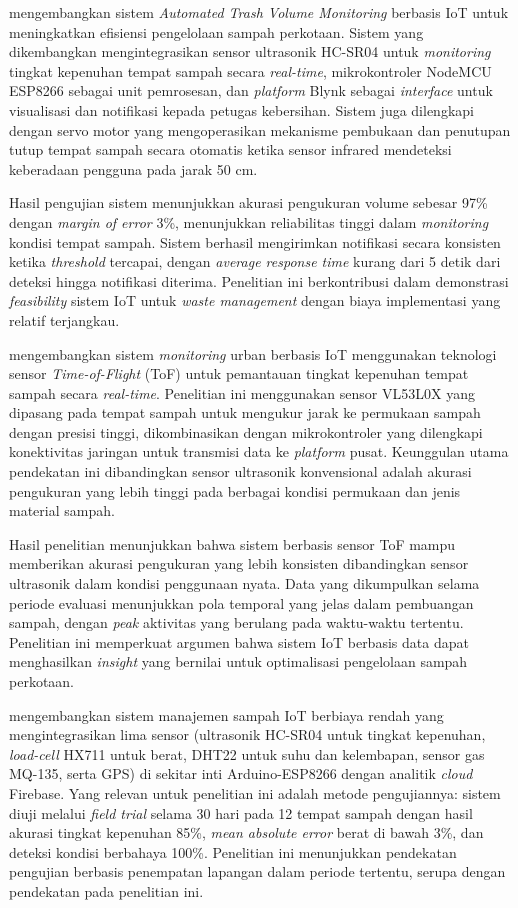 \textcite{latifah2021} mengembangkan sistem \textit{Automated Trash Volume Monitoring} berbasis IoT untuk meningkatkan efisiensi pengelolaan sampah perkotaan. Sistem yang dikembangkan mengintegrasikan sensor ultrasonik HC-SR04 untuk \textit{monitoring} tingkat kepenuhan tempat sampah secara \textit{real-time}, mikrokontroler NodeMCU ESP8266 sebagai unit pemrosesan, dan \textit{platform} Blynk sebagai \textit{interface} untuk visualisasi dan notifikasi kepada petugas kebersihan. Sistem juga dilengkapi dengan servo motor yang mengoperasikan mekanisme pembukaan dan penutupan tutup tempat sampah secara otomatis ketika sensor infrared mendeteksi keberadaan pengguna pada jarak 50 cm.

Hasil pengujian sistem menunjukkan akurasi pengukuran volume sebesar 97\% dengan \textit{margin of error} 3\%, menunjukkan reliabilitas tinggi dalam \textit{monitoring} kondisi tempat sampah. Sistem berhasil mengirimkan notifikasi secara konsisten ketika \textit{threshold} tercapai, dengan \textit{average response time} kurang dari 5 detik dari deteksi hingga notifikasi diterima. Penelitian ini berkontribusi dalam demonstrasi \textit{feasibility} sistem IoT untuk \textit{waste management} dengan biaya implementasi yang relatif terjangkau.

\textcite{pires2025} mengembangkan sistem \textit{monitoring} urban berbasis IoT menggunakan teknologi sensor \textit{Time-of-Flight} (ToF) untuk pemantauan tingkat kepenuhan tempat sampah secara \textit{real-time}. Penelitian ini menggunakan sensor VL53L0X yang dipasang pada tempat sampah untuk mengukur jarak ke permukaan sampah dengan presisi tinggi, dikombinasikan dengan mikrokontroler yang dilengkapi konektivitas jaringan untuk transmisi data ke \textit{platform} pusat. Keunggulan utama pendekatan ini dibandingkan sensor ultrasonik konvensional adalah akurasi pengukuran yang lebih tinggi pada berbagai kondisi permukaan dan jenis material sampah.

Hasil penelitian menunjukkan bahwa sistem berbasis sensor ToF mampu memberikan akurasi pengukuran yang lebih konsisten dibandingkan sensor ultrasonik dalam kondisi penggunaan nyata. Data yang dikumpulkan selama periode evaluasi menunjukkan pola temporal yang jelas dalam pembuangan sampah, dengan \textit{peak} aktivitas yang berulang pada waktu-waktu tertentu. Penelitian ini memperkuat argumen bahwa sistem IoT berbasis data dapat menghasilkan \textit{insight} yang bernilai untuk optimalisasi pengelolaan sampah perkotaan.

\textcite{iotsmartwaste2025urban} mengembangkan sistem manajemen sampah IoT berbiaya rendah yang mengintegrasikan lima sensor (ultrasonik HC-SR04 untuk tingkat kepenuhan, \textit{load-cell} HX711 untuk berat, DHT22 untuk suhu dan kelembapan, sensor gas MQ-135, serta GPS) di sekitar inti Arduino-ESP8266 dengan analitik \textit{cloud} Firebase. Yang relevan untuk penelitian ini adalah metode pengujiannya: sistem diuji melalui \textit{field trial} selama 30 hari pada 12 tempat sampah dengan hasil akurasi tingkat kepenuhan 85\%, \textit{mean absolute error} berat di bawah 3\%, dan deteksi kondisi berbahaya 100\%. Penelitian ini menunjukkan pendekatan pengujian berbasis penempatan lapangan dalam periode tertentu, serupa dengan pendekatan pada penelitian ini.

